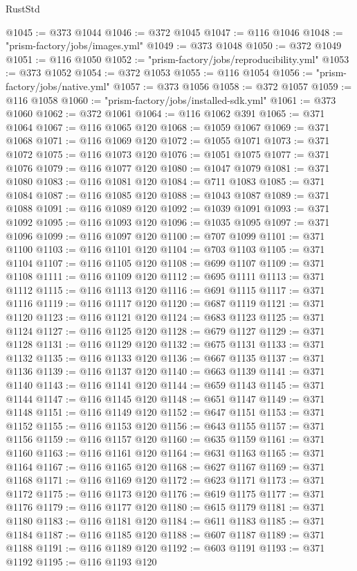 \begin{lexlean}{RustStd}
\begin{coremodule}
@1045 := @373 @1044
@1046 := @372 @1045
@1047 := @116 @1046
@1048 := "prism-factory/jobs/images.yml"
@1049 := @373 @1048
@1050 := @372 @1049
@1051 := @116 @1050
@1052 := "prism-factory/jobs/reproducibility.yml"
@1053 := @373 @1052
@1054 := @372 @1053
@1055 := @116 @1054
@1056 := "prism-factory/jobs/native.yml"
@1057 := @373 @1056
@1058 := @372 @1057
@1059 := @116 @1058
@1060 := "prism-factory/jobs/installed-sdk.yml"
@1061 := @373 @1060
@1062 := @372 @1061
@1064 := @116 @1062 @391
@1065 := @371 @1064
@1067 := @116 @1065 @120
@1068 := @1059 @1067
@1069 := @371 @1068
@1071 := @116 @1069 @120
@1072 := @1055 @1071
@1073 := @371 @1072
@1075 := @116 @1073 @120
@1076 := @1051 @1075
@1077 := @371 @1076
@1079 := @116 @1077 @120
@1080 := @1047 @1079
@1081 := @371 @1080
@1083 := @116 @1081 @120
@1084 := @711 @1083
@1085 := @371 @1084
@1087 := @116 @1085 @120
@1088 := @1043 @1087
@1089 := @371 @1088
@1091 := @116 @1089 @120
@1092 := @1039 @1091
@1093 := @371 @1092
@1095 := @116 @1093 @120
@1096 := @1035 @1095
@1097 := @371 @1096
@1099 := @116 @1097 @120
@1100 := @707 @1099
@1101 := @371 @1100
@1103 := @116 @1101 @120
@1104 := @703 @1103
@1105 := @371 @1104
@1107 := @116 @1105 @120
@1108 := @699 @1107
@1109 := @371 @1108
@1111 := @116 @1109 @120
@1112 := @695 @1111
@1113 := @371 @1112
@1115 := @116 @1113 @120
@1116 := @691 @1115
@1117 := @371 @1116
@1119 := @116 @1117 @120
@1120 := @687 @1119
@1121 := @371 @1120
@1123 := @116 @1121 @120
@1124 := @683 @1123
@1125 := @371 @1124
@1127 := @116 @1125 @120
@1128 := @679 @1127
@1129 := @371 @1128
@1131 := @116 @1129 @120
@1132 := @675 @1131
@1133 := @371 @1132
@1135 := @116 @1133 @120
@1136 := @667 @1135
@1137 := @371 @1136
@1139 := @116 @1137 @120
@1140 := @663 @1139
@1141 := @371 @1140
@1143 := @116 @1141 @120
@1144 := @659 @1143
@1145 := @371 @1144
@1147 := @116 @1145 @120
@1148 := @651 @1147
@1149 := @371 @1148
@1151 := @116 @1149 @120
@1152 := @647 @1151
@1153 := @371 @1152
@1155 := @116 @1153 @120
@1156 := @643 @1155
@1157 := @371 @1156
@1159 := @116 @1157 @120
@1160 := @635 @1159
@1161 := @371 @1160
@1163 := @116 @1161 @120
@1164 := @631 @1163
@1165 := @371 @1164
@1167 := @116 @1165 @120
@1168 := @627 @1167
@1169 := @371 @1168
@1171 := @116 @1169 @120
@1172 := @623 @1171
@1173 := @371 @1172
@1175 := @116 @1173 @120
@1176 := @619 @1175
@1177 := @371 @1176
@1179 := @116 @1177 @120
@1180 := @615 @1179
@1181 := @371 @1180
@1183 := @116 @1181 @120
@1184 := @611 @1183
@1185 := @371 @1184
@1187 := @116 @1185 @120
@1188 := @607 @1187
@1189 := @371 @1188
@1191 := @116 @1189 @120
@1192 := @603 @1191
@1193 := @371 @1192
@1195 := @116 @1193 @120

\end{coremodule}
\end{lexlean}
